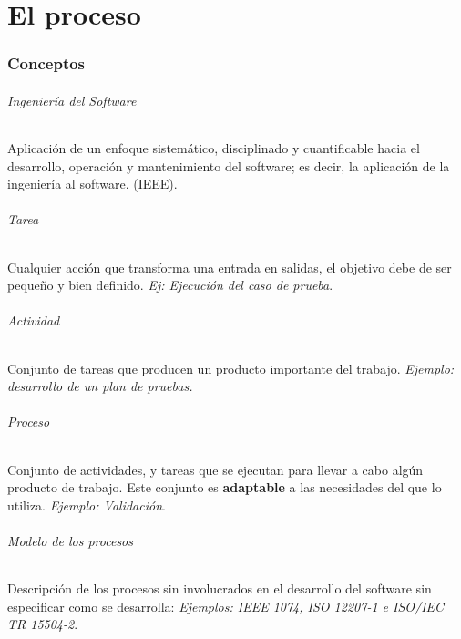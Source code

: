 \part{El proceso}

\section{Conceptos}
\paragraph{Ingeniería del Software} Aplicación de un enfoque sistemático, disciplinado y cuantificable hacia el desarrollo, operación y mantenimiento del software; es decir, la aplicación de la ingeniería al software. (IEEE). %



\paragraph{Tarea} Cualquier acción que transforma una entrada en salidas, el objetivo debe de ser pequeño y bien definido. \textit{Ej: Ejecución del caso de prueba}.


\paragraph{Actividad} Conjunto de tareas que producen un producto importante del trabajo. \textit{Ejemplo: desarrollo de un plan de pruebas.}

\paragraph{Proceso} Conjunto de actividades, y tareas que se ejecutan para llevar a cabo algún producto de trabajo. Este conjunto es \textbf{adaptable} a las necesidades del que lo utiliza. \textit{Ejemplo: Validación}.


\paragraph{Modelo de los procesos} Descripción de los procesos sin involucrados en el desarrollo del software sin especificar como se desarrolla: \textit{Ejemplos: IEEE 1074, ISO 12207-1 e ISO/IEC TR 15504-2}.


